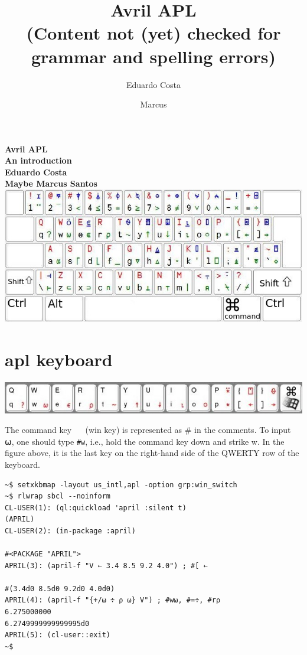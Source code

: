 \documentclass[a4paper,12pt]{book}
\title{\large Avril APL\\
{\normalsize (Content not (yet) checked for grammar and spelling errors)}}
\author{Eduardo Costa \and Marcus}
\date{}
\begin{document}
\begin{titlepage}
    \centering
    \vfill
    {\bfseries\Large
        Avril APL\\
        An introduction\\
        \vskip2cm
        Eduardo Costa\\
        Maybe Marcus Santos\\
    }    
    \vfill
    \includegraphics[width=15cm]{figs/aplkb-largekeys.jpg}
    \vfill
    \vfill
\end{titlepage}

\thispagestyle{empty}

\clearpage

\chapter{apl keyboard}
\includegraphics{figs/qwerty-row.jpg}

\large
The command key ~\cmdkey~ (win key)
is represented as \# in the comments.
To input ⍵, one should type \verb|#w|, i.e.,
hold the command key down and strike w.
In the figure above, it is the last key
on the right-hand side of the QWERTY row
of the keyboard.

\label{april:install}
\large
\begin{lstlisting}[language=apl]
~$ setxkbmap -layout us_intl,apl -option grp:win_switch
~$ rlwrap sbcl --noinform
CL-USER(1): (ql:quickload 'april :silent t)
(APRIL)
CL-USER(2): (in-package :april)

#<PACKAGE "APRIL">
APRIL(3): (april-f "V ← 3.4 8.5 9.2 4.0") ; #[ ←

#(3.4d0 8.5d0 9.2d0 4.0d0)
APRIL(4): (april-f "{+/⍵ ÷ ⍴ ⍵} V") ; #w⍵, #=÷, #r⍴
6.275000000
6.2749999999999995d0
APRIL(5): (cl-user::exit)
~$ 
\end{lstlisting}
\end{document}
